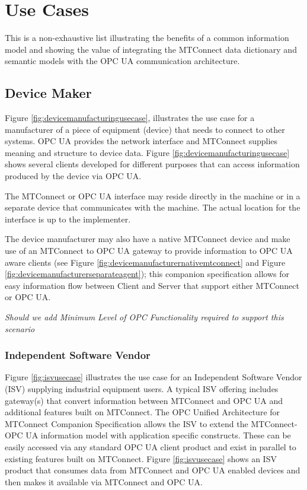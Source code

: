 \section{Use Cases}

This is a non-exhaustive list illustrating the benefits of a common information model and showing the value of integrating the MTConnect data dictionary and semantic models with the OPC UA communication architecture.

\subsection{Device Maker}

Figure \ref{fig:devicemanufacturingusecase}, illustrates the use case for a manufacturer of a piece of equipment (device) that needs to connect to other systems. OPC UA provides the network interface and MTConnect supplies meaning and structure to device data. Figure \ref{fig:devicemanufacturingusecase} shows several clients developed for different purposes that can access information produced by the device via OPC UA.


\FloatBarrier

The MTConnect or OPC UA interface may reside directly in the machine or in a separate device that communicates with the machine. The actual location for the interface is up to the implementer.

The device manufacturer may also have a native MTConnect device and make use of an MTConnect to OPC UA gateway to provide  information to OPC UA aware clients (see Figure \ref{fig:devicemanufacturernativemtconnect} and Figure \ref{fig:devicemanufacturerseparateagent}); this companion specification allows for easy information flow between Client and Server that support either MTConnect or OPC UA.



\textit{Should we add Minimum Level of OPC Functionality required to support this scenario}


\FloatBarrier

\FloatBarrier

\subsubsection{Independent Software Vendor}

Figure \ref{fig:isvusecase} illustrates the use case for an Independent Software Vendor (ISV) supplying industrial equipment users. A typical ISV offering includes gateway(s) that convert information between MTConnect and OPC UA and additional features built on MTConnect. The OPC Unified Architecture for MTConnect Companion Specification allows the ISV to extend the MTConnect-OPC UA information model with application specific constructs. These can be easily accessed via any standard OPC UA client product and exist in parallel to existing features built on MTConnect. Figure \ref{fig:isvusecase} shows an ISV product that consumes data from MTConnect and OPC UA enabled devices and then makes it available via MTConnect and OPC UA.

